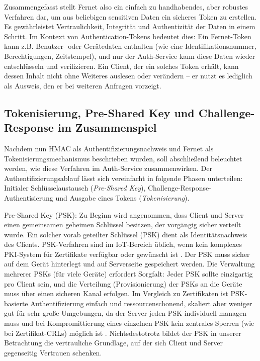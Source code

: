Zusammengefasst stellt Fernet also ein einfach zu handhabendes, aber robustes Verfahren dar, um aus beliebigen sensitiven Daten ein sicheres Token zu erstellen. Es gewährleistet Vertraulichkeit, Integrität und Authentizität der Daten in einem Schritt. Im Kontext von Authentication-Tokens bedeutet dies: Ein Fernet-Token kann z.B. Benutzer- oder Gerätedaten enthalten (wie eine Identifikationsnummer, Berechtigungen, Zeitstempel), und nur der Auth-Service kann diese Daten wieder entschlüsseln und verifizieren. Ein Client, der ein solches Token erhält, kann dessen Inhalt nicht ohne Weiteres auslesen oder verändern – er nutzt es lediglich als \glqq Ausweis\grqq{}, den er bei weiteren Anfragen vorzeigt.

\subsection{Tokenisierung, Pre-Shared Key und Challenge-Response im Zusammenspiel}

Nachdem nun HMAC als Authentifizierungsnachweis und Fernet als Tokenisierungsmechanismus beschrieben wurden, soll abschließend beleuchtet werden, wie diese Verfahren im Auth-Service zusammenwirken. Der Authentifizierungsablauf lässt sich vereinfacht in folgende Phasen unterteilen: Initialer Schlüsselaustausch (\textit{Pre-Shared Key}), Challenge-Response-Authentisierung und Ausgabe eines Tokens (\textit{Tokenisierung}).

Pre-Shared Key (PSK): Zu Beginn wird angenommen, dass Client und Server einen gemeinsamen geheimen Schlüssel besitzen, der vorgängig sicher verteilt wurde. Ein solcher vorab geteilter Schlüssel (PSK) dient als Identitätsnachweis des Clients. PSK-Verfahren sind im IoT-Bereich üblich, wenn kein komplexes PKI-System für Zertifikate verfügbar oder gewünscht ist \cite{AvnetPSK}. Der PSK muss sicher auf dem Gerät hinterlegt und auf Serverseite gespeichert werden. Die Verwaltung mehrerer PSKs (für viele Geräte) erfordert Sorgfalt: Jeder PSK sollte einzigartig pro Client sein, und die Verteilung (Provisionierung) der PSKs an die Geräte muss über einen sicheren Kanal erfolgen. Im Vergleich zu Zertifikaten ist PSK-basierte Authentifizierung einfach und ressourcenschonend, skaliert aber weniger gut für sehr große Umgebungen, da der Server jeden PSK individuell managen muss und bei Kompromittierung eines einzelnen PSK kein zentrales Sperren (wie bei Zertifikat-CRLs) möglich ist \cite{AvnetPSK}. Nichtsdestotrotz bildet der PSK in unserer Betrachtung die vertrauliche Grundlage, auf der sich Client und Server gegenseitig Vertrauen schenken.

